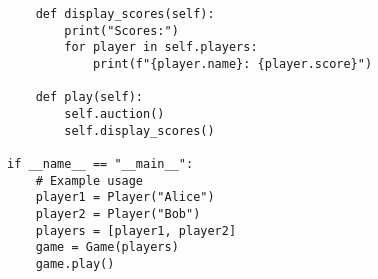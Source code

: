 \documentclass{article}
\begin{document}
\begin{verbatim}
    def display_scores(self):
        print("Scores:")
        for player in self.players:
            print(f"{player.name}: {player.score}")

    def play(self):
        self.auction()
        self.display_scores()

if __name__ == "__main__":
    # Example usage
    player1 = Player("Alice")
    player2 = Player("Bob")
    players = [player1, player2]
    game = Game(players)
    game.play()
\end{verbatim}
\end{document}
